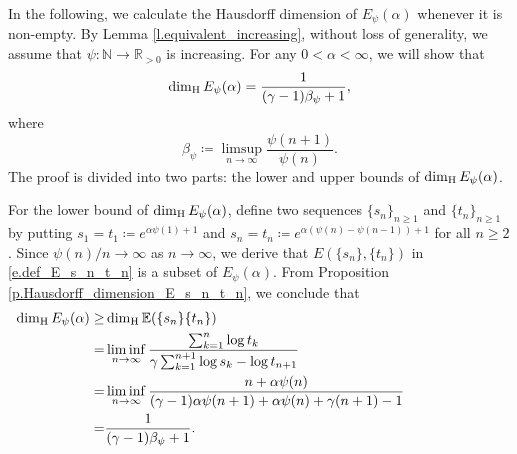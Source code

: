 \documentclass[12pt,reqno]{amsart}
\renewcommand{\=}{\coloneqq}
\theoremstyle{plain}
\begin{document}
In the following, we calculate the Hausdorff dimension of $E_{\psi}(\alpha)$ whenever it is non-empty.
By Lemma \ref{l.equivalent_increasing}, without loss of generality, we assume that $\psi:\mathbb{N}\to\mathbb{R}_{>0}$ is increasing. For any $0<\alpha<\infty$, we will show that
\begin{equation*}
\dim_{\rm H}E_{\psi}(\alpha)= \frac{1}{(\gamma-1)\beta_\psi+1},
 \end{equation*}
where
\[
  \beta_\psi \coloneqq \limsup_{n\to \infty }
    \frac{\psi(n+1)}{\psi(n)}.
\]
The proof is divided into two parts: the lower and upper bounds of $\dim_{\rm H}E_{\psi}(\alpha)$.

For the lower bound of  $\dim_{\rm H}E_{\psi}(\alpha)$, define two sequences $\{s_{n}\}_{n\geq 1}$ and $\{t_{n}\}_{n\geq 1}$ by putting $s_1=t_1\coloneqq e^{\alpha \psi(1)+1}$ and $s_n=t_n\coloneqq e^{\alpha(\psi(n)-\psi(n-1))+1}$ for all $n\geq 2$. Since $\psi(n)/n \to \infty$ as $n\to \infty$, we derive that $E(\{s_n\},\{t_n\})$ in \eqref{e.def_E_s_n_t_n} is a subset of $E_\psi(\alpha)$.
From Proposition \ref{p.Hausdorff_dimension_E_s_n_t_n}, we conclude that
\begin{alignat}{2}
 \dim_{\mathrm{H}}E_{\psi}(\alpha) \geq&\dim_{\mathrm{H}}\mathbb{E} (\{s_n\}\{t_n\})
        && \qquad \qquad \qquad\notag \\
        =&\liminf_{n\to \infty}\frac{\sum_{k=1}^n\log t_k}
        {\gamma \sum_{k=1}^{n+1}\log s_k-\log t_{n+1}} \notag\\
        =&\liminf_{n\to \infty}\frac{n+\alpha\psi(n)}
        {(\gamma-1)\alpha \psi(n+1)+\alpha\psi(n)+\gamma (n+1)-1} \notag \\
        =&\frac{1}{(\gamma-1)\beta_\psi+1}.\label{e.A_lower}
\end{alignat}
\end{document}
